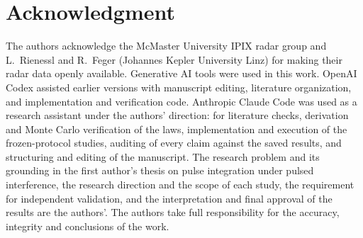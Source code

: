 \documentclass[journal]{IEEEtran}
\begin{document}
\section*{Acknowledgment}
The authors acknowledge the McMaster University IPIX radar group and L.~Rienessl and R.~Feger (Johannes Kepler University Linz) for making their radar data openly available. Generative AI tools were used in this work. OpenAI Codex assisted earlier versions with manuscript editing, literature organization, and implementation and verification code. Anthropic Claude Code was used as a research assistant under the authors' direction: for literature checks, derivation and Monte Carlo verification of the laws, implementation and execution of the frozen-protocol studies, auditing of every claim against the saved results, and structuring and editing of the manuscript. The research problem and its grounding in the first author's thesis on pulse integration under pulsed interference, the research direction and the scope of each study, the requirement for independent validation, and the interpretation and final approval of the results are the authors'. The authors take full responsibility for the accuracy, integrity and conclusions of the work.



\end{document}

